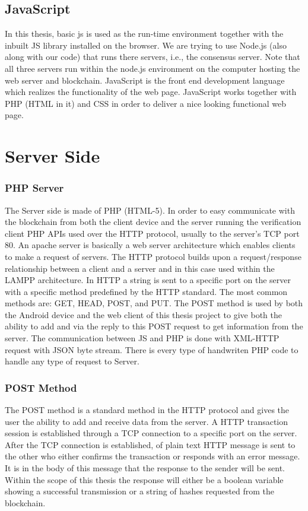 \subsection{JavaScript}
In this thesis, basic js is used as the run-time environment together with the inbuilt JS library installed on the browser. We are trying to use Node.js (also along with our code) that runs there servers, i.e., the consensus server. Note that all three servers run within the node.js environment on the computer hosting the web server and blockchain. JavaScript is the front end development language which realizes the functionality of the web page. JavaScript works together with PHP (HTML in it) and CSS in order to deliver a nice looking functional web page.

\section{Server Side}
\label{sec:server}
\subsubsection{PHP Server}
The Server side is made of PHP (HTML-5). In order to easy communicate with the blockchain from both the client device and the server running the verification client PHP APIs used over the HTTP protocol, usually to the server's TCP port 80. An apache server is basically a web server architecture which enables clients to make a request of servers. The HTTP protocol builds upon a request/response relationship between a client and a server and in this case used within the LAMPP architecture. In HTTP a string is sent to a specific port on the server with a specific method predefined by the HTTP standard. The most common methods are: GET, HEAD, POST, and PUT. The POST method is used by both the Android device and the web client of this thesis project to give both the ability to add and via the reply to this POST request to get information from the server. The communication between JS and PHP is done with XML-HTTP request with JSON byte stream. There is every type of handwriten PHP code to handle any type of request to Server.
\subsubsection{POST Method}
The POST method is a standard method in the HTTP protocol and gives the user the ability to add and receive data from the server. A HTTP transaction session is established through a TCP connection to a specific port on the server. After the TCP connection is established, of plain text HTTP message is sent to the other who either confirms the transaction or responds with an error message. It is in the body of this message that the response to the sender will be sent. Within the scope of this thesis the response will either be a boolean variable showing a successful transmission or a string of hashes requested from the blockchain.
